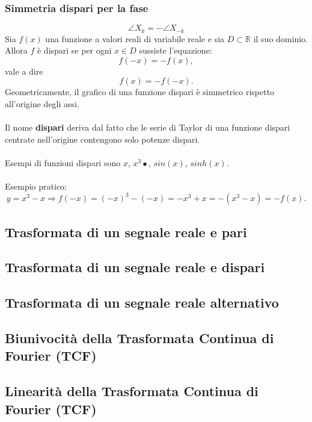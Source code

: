 \documentclass[12pt,oneside,openany]{memoir}
\numberwithin{equation}{subsection}
\begin{document}
\subsubsection{Simmetria dispari per la fase}
\begin{equation}
	\angle X_k = - \angle X_{-k}
\end{equation}
Sia $f(x)$ una funzione a valori reali di variabile reale e sia $D \subset \mathbb{R}$ il suo dominio. Allora $f$ \`e dispari se per ogni $x \in D$ sussiste l'equazione:
\[
	f(-x) = - f(x),
\]
vale a dire
\[
	f(x) = - f(-x).
\]
Geometricamente, il grafico di una funzione dispari \`e simmetrico rispetto all'origine degli assi.\\
\\
Il nome \textbf{dispari} deriva dal fatto che le serie di Taylor di una funzione dispari centrate nell'origine contengono solo potenze dispari.\\
\\
Esempi di funzioni dispari sono $x$, $x^3•$, $sin(x)$, $sinh(x)$.\\
\\
Esempio pratico:
\[
	y = x^3 - x \Longrightarrow f(-x) = (-x)^3 - (-x) = -x^3 + x = -(x^3 - x) = -f(x).
\]

\newpage
\subsection{Trasformata di un segnale reale e pari}

\newpage
\subsection{Trasformata di un segnale reale e dispari}

\newpage
\subsection{Trasformata di un segnale reale alternativo}

\newpage
\subsection{Biunivocit\`a della Trasformata Continua di Fourier (TCF)}

\newpage
\subsection{Linearit\`a della Trasformata Continua di Fourier (TCF)}
\end{document}
